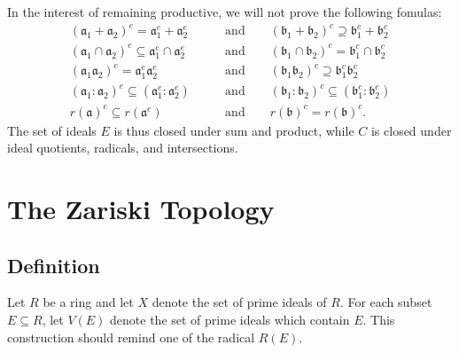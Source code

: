 \documentclass[11pt]{article}
\begin{document}
In the interest of remaining productive, we will not prove the following fomulas:
\begin{align*}
	(\mathfrak{a}_{1} + \mathfrak{a}_{2})^{e} = \mathfrak{a}_{1}^{e} + \mathfrak{a}_{2}^{e} \qquad &\text{and} \qquad (\mathfrak{b}_{1} + \mathfrak{b}_{2})^{c} \supseteq \mathfrak{b}_{1}^{c} + \mathfrak{b}_{2}^{c} \\
	(\mathfrak{a}_{1} \cap \mathfrak{a}_{2})^{e} \subseteq \mathfrak{a}_{1}^{e} \cap \mathfrak{a}_{2}^{e} \qquad &\text{and} \qquad (\mathfrak{b}_{1} \cap \mathfrak{b}_{2})^{c} = \mathfrak{b}_{1}^{c} \cap \mathfrak{b}_{2}^{c}  \\
	(\mathfrak{a}_{1}\mathfrak{a}_{2})^{e} = \mathfrak{a}_{1}^{e}\mathfrak{a}_{2}^{e} \qquad &\text{and} \qquad (\mathfrak{b}_{1}\mathfrak{b}_{2})^{c} \supseteq \mathfrak{b}_{1}^{c}\mathfrak{b}_{2}^{c} \\
	(\mathfrak{a}_{1} : \mathfrak{a}_{2})^{e} \subseteq (\mathfrak{a}_{1}^{e} : \mathfrak{a}_{2}^{e}) \qquad &\text{and} \qquad (\mathfrak{b}_{1} : \mathfrak{b}_{2})^{c} \subseteq (\mathfrak{b}_{1}^{c} : \mathfrak{b}_{2}^{c}) \\
	r(\mathfrak{a})^{e} \subseteq r(\mathfrak{a}^{e}) \qquad &\text{and} \qquad r(\mathfrak{b})^{c} = r(\mathfrak{b})^{c}.
\end{align*}
The set of ideals $E$ is thus closed under sum and product, while $C$ is closed under ideal quotients, radicals, and intersections.


\section{The Zariski Topology}


\subsection{Definition}

Let $R$ be a ring and let $X$ denote the set of prime ideals of $R$. For each subset $E \subseteq R$, let $V(E)$ denote the set of prime ideals which contain $E$. This construction should remind one of the radical $R(E)$.
\end{document}
